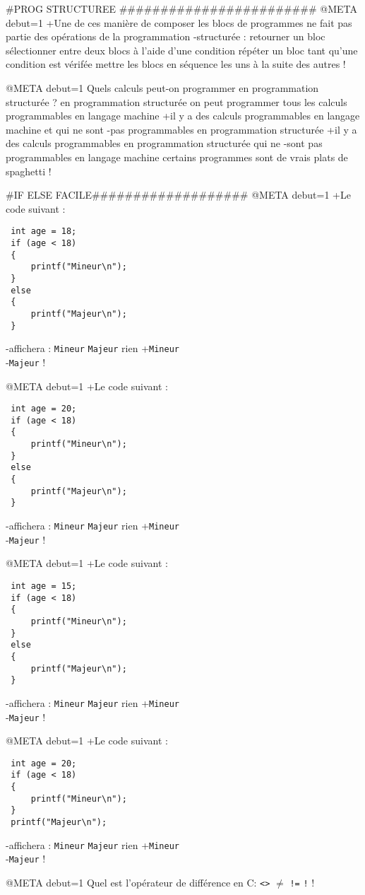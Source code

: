 #PROG STRUCTUREE ########################
@META debut=1
+Une de ces manière de composer les blocs de
programmes ne fait pas partie des opérations de la programmation
-structurée :
 retourner un bloc
 sélectionner entre deux blocs à l'aide d'une condition
 répéter un bloc tant qu'une condition est vérifée
 mettre les blocs en séquence les uns à la suite des autres
!

@META debut=1
Quels calculs peut-on programmer en programmation structurée ?
 en programmation structurée on peut programmer tous les calculs programmables en langage machine
+il y a des calculs programmables en langage machine et qui ne sont
-pas programmables en programmation structurée
+il y a des calculs programmables en programmation structurée qui ne
-sont pas programmables en langage machine
 certains programmes sont de vrais plats de spaghetti
!

#IF ELSE FACILE###################
@META debut=1
+Le code suivant :
 \begin{verbatim}
 int age = 18;
 if (age < 18)
 {
     printf("Mineur\n"); 
 }
 else
 {
     printf("Majeur\n"); 
 }
 \end{verbatim}
-affichera :
 \verb|Mineur|
 \verb|Majeur|
 rien
+\verb|Mineur|\\
-\verb|Majeur|
!

@META debut=1
+Le code suivant :
 \begin{verbatim}
 int age = 20;
 if (age < 18)
 {
     printf("Mineur\n"); 
 }
 else
 {
     printf("Majeur\n"); 
 }
 \end{verbatim}
-affichera :
 \verb|Mineur|
 \verb|Majeur|
 rien
+\verb|Mineur|\\
-\verb|Majeur|
!

@META debut=1
+Le code suivant :
 \begin{verbatim}
 int age = 15;
 if (age < 18)
 {
     printf("Mineur\n"); 
 }
 else
 {
     printf("Majeur\n"); 
 }
 \end{verbatim}
-affichera :
 \verb|Mineur|
 \verb|Majeur|
 rien
+\verb|Mineur|\\
-\verb|Majeur|
!

@META debut=1
+Le code suivant :
 \begin{verbatim}
 int age = 20;
 if (age < 18)
 {
     printf("Mineur\n"); 
 }
 printf("Majeur\n"); 
\end{verbatim}
-affichera :
 \verb|Mineur|
 \verb|Majeur|
 rien
+\verb|Mineur|\\
-\verb|Majeur|
!

@META debut=1
Quel est l'opérateur de différence en C:
 \verb|<>|
 \texttt{$\neq$}
 \verb|!=|
 \verb|!|
!

